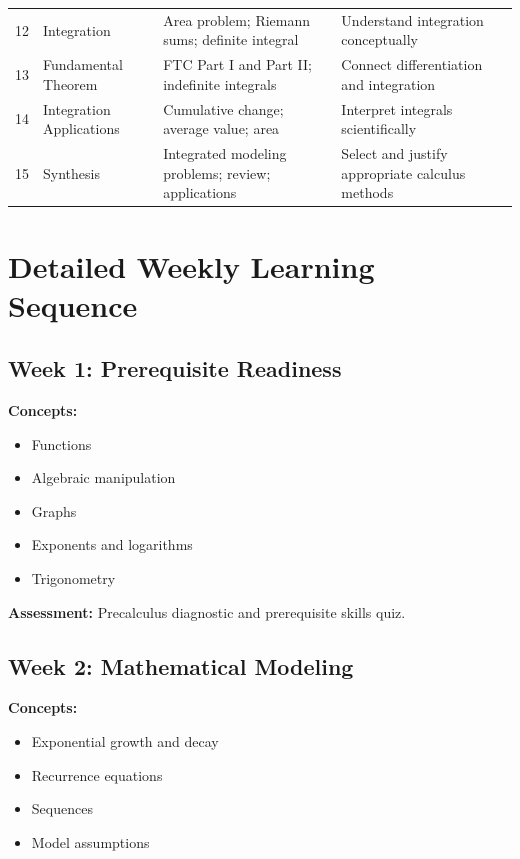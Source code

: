 \documentclass[11pt]{article}
\begin{document}
\begin{longtable}{p{0.7cm}p{3.2cm}p{5.5cm}p{4.2cm}}
12
& Integration
& Area problem; Riemann sums; definite integral
& Understand integration conceptually \\

13
& Fundamental Theorem
& FTC Part I and Part II; indefinite integrals
& Connect differentiation and integration \\

14
& Integration Applications
& Cumulative change; average value; area
& Interpret integrals scientifically \\

15
& Synthesis
& Integrated modeling problems; review; applications
& Select and justify appropriate calculus methods \\

\bottomrule
\end{longtable}

\section{Detailed Weekly Learning Sequence}

\subsection*{Week 1: Prerequisite Readiness}

\textbf{Concepts:}
\begin{itemize}
    \item Functions
    \item Algebraic manipulation
    \item Graphs
    \item Exponents and logarithms
    \item Trigonometry
\end{itemize}

\textbf{Assessment:}
Precalculus diagnostic and prerequisite skills quiz.

\subsection*{Week 2: Mathematical Modeling}

\textbf{Concepts:}
\begin{itemize}
    \item Exponential growth and decay
    \item Recurrence equations
    \item Sequences
    \item Model assumptions
\end{itemize}
\end{document}
